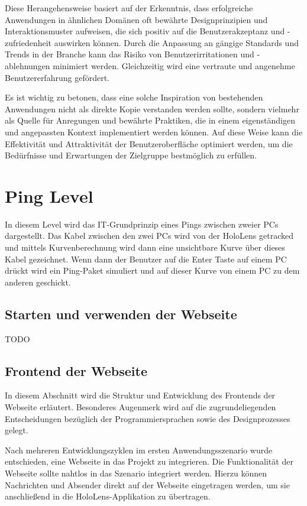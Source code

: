 Diese Herangehensweise basiert auf der Erkenntnis, dass erfolgreiche Anwendungen in ähnlichen Domänen oft bewährte
Designprinzipien und Interaktionsmuster aufweisen, die sich positiv auf die Benutzerakzeptanz und -zufriedenheit auswirken
können. Durch die Anpassung an gängige Standards und Trends in der Branche kann das Risiko von Benutzerirritationen
und -ablehnungen minimiert werden. Gleichzeitig wird eine vertraute und angenehme Benutzererfahrung gefördert.

Es ist wichtig zu betonen, dass eine solche Inspiration von bestehenden Anwendungen nicht als direkte Kopie verstanden
werden sollte, sondern vielmehr als Quelle für Anregungen und bewährte Praktiken, die in einem eigenständigen und angepassten
Kontext implementiert werden können. Auf diese Weise kann die Effektivität und Attraktivität der Benutzeroberfläche
optimiert werden, um die Bedürfnisse und Erwartungen der Zielgruppe bestmöglich zu erfüllen.

\section{Ping Level}
In diesem Level wird das IT-Grundprinzip eines Pings zwischen zweier
PCs dargestellt. Das Kabel zwischen den zwei PCs wird von der
HoloLens getracked und mittels Kurvenberechnung wird dann eine
unsichtbare Kurve über dieses Kabel gezeichnet. Wenn dann der Benutzer
auf die Enter Taste auf einem PC drückt wird ein Ping-Paket simuliert
und auf dieser Kurve von einem PC zu dem anderen geschickt.

\subsection{Starten und verwenden der Webseite} 
TODO

\subsection{Frontend der Webseite} 
In diesem Abschnitt wird die Struktur und Entwicklung des Frontends der Webseite erläutert. Besonderes Augenmerk wird
auf die zugrundeliegenden Entscheidungen bezüglich der Programmiersprachen sowie des Designprozesses gelegt.

Nach mehreren Entwicklungszyklen im ersten Anwendungsszenario wurde entschieden, eine Webseite in das Projekt zu
integrieren. Die Funktionalität der Webseite sollte nahtlos in das Szenario integriert werden. Hierzu können Nachrichten
und Absender direkt auf der Webseite eingetragen werden, um sie anschließend in die HoloLens-Applikation zu übertragen.

